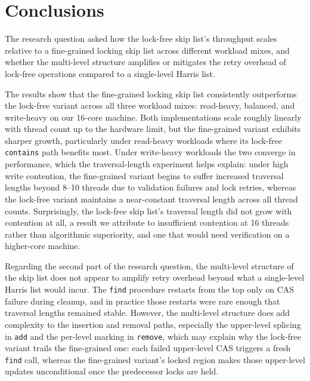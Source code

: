 \documentclass[11pt,a4paper]{article}
\begin{document}

\section{Conclusions}
\label{sec:conclusions}

The research question asked how the lock-free skip list's throughput scales
relative to a fine-grained locking skip list across different workload mixes,
and whether the multi-level structure amplifies or mitigates the retry overhead
of lock-free operations compared to a single-level Harris list.

The results show that the fine-grained locking skip list consistently
outperforms the lock-free variant across all three workload mixes: read-heavy,
balanced, and write-heavy on our 16-core machine. Both implementations scale
roughly linearly with thread count up to the hardware limit, but the fine-grained
variant exhibits sharper growth, particularly under read-heavy workloads where
its lock-free \texttt{contains} path benefits most. Under write-heavy workloads
the two converge in performance, which the traversal-length experiment helps
explain: under high write contention, the fine-grained variant begins to suffer
increased traversal lengths beyond 8--10 threads due to validation failures and
lock retries, whereas the lock-free variant maintains a near-constant traversal
length across all thread counts. Surprisingly, the lock-free skip list's
traversal length did not grow with contention at all, a result we attribute to
insufficient contention at 16 threads rather than algorithmic superiority, and
one that would need verification on a higher-core machine.

Regarding the second part of the research question, the multi-level structure
of the skip list does not appear to amplify retry overhead beyond what a
single-level Harris list would incur. The \texttt{find} procedure restarts from
the top only on CAS failure during cleanup, and in practice those restarts were
rare enough that traversal lengths remained stable. However, the multi-level
structure does add complexity to the insertion and removal paths, especially
the upper-level splicing in \texttt{add} and the per-level marking in
\texttt{remove}, which may explain why the lock-free variant trails the
fine-grained one: each failed upper-level CAS triggers a fresh \texttt{find}
call, whereas the fine-grained variant's locked region makes those upper-level
updates unconditional once the predecessor locks are held.
\end{document}
